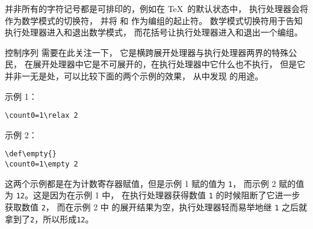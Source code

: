 \documentclass{book}
\begin{document}
并非所有的字符记号都是可排印的，例如在 \TeX\ 的默认状态中，
执行处理器会将  作为数学模式的切换符，
并将 和 作为编组的起止符。
数学模式切换符用于告知执行处理器进入和退出数学模式，
而花括号让执行处理器进入和退出一个编组。

控制序列  需要在此关注一下，
它是横跨展开处理器与执行处理器两界的特殊公民，
在展开处理器中它是不可展开的，在执行处理器中它什么也不执行，
但是它并非一无是处，可以比较下面的两个示例的效果，
从中发现  的用途。\par 示例 1：
\begin{verbatim}
\count0=1\relax 2
\end{verbatim}
\par 示例 2：
\begin{verbatim}
\def\empty{}
\count0=1\empty 2
\end{verbatim}
这两个示例都是在为计数寄存器赋值，但是示例 1 赋的值为 {\tt 1}，
而示例 2 赋的值为 {\tt 12}。这是因为在示例 1 中，
在执行处理器获得数值 {\tt 1} 的时候阻断了它进一步获取数值 {\tt 2}，
而在示例 2 中  的展开结果为空，执行处理器轻而易举地继 {\tt 1}
之后就拿到了{\tt 2}，所以形成{\tt 12}。

\end{document}

